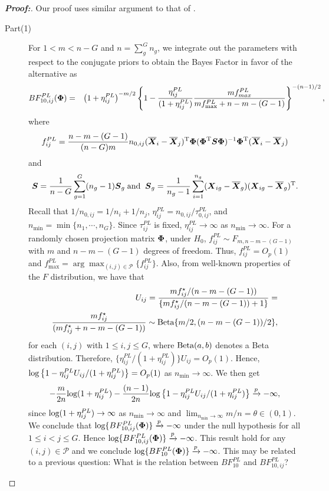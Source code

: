 \documentclass[times,sort&compress,3p]{elsarticle}
\theoremstyle{plain}%
\theoremstyle{definition}
\def\log{\hbox{log}}
\def\Beta{\hbox{Beta}}
\def\log{\hbox{log}}
\def\Beta{\hbox{Beta}}
\def\bse{\begin{eqnarray*}}
\def\ese{\end{eqnarray*}}
\def\be{\begin{eqnarray}}
\def\ee{\end{eqnarray}}
\def\trans{^{\rm T}}
\newcommand{\uS}       {\mbox{\boldmath$S$}}
\newcommand{\uX}       {\mbox{\boldmath$X$}}
\newcommand{\uPhi}              {\mbox{\boldmath$\Phi$}}
\begin{document}
\begin{proof}[\textbf{\upshape Proof:}]
Our proof uses similar argument to that of \citep{zoh2018powerful}.
\begin{description}
\item[Part(1)]
For $1 < m < n - G$ and $n = \sum^{G}_{g}n_g$, we integrate out the parameters with respect to the conjugate priors to obtain the Bayes Factor in favor of the alternative as
\be
BF^{PL}_{10, ij}(\uPhi) &=&\left(1 + \eta^{PL}_{ij} \right)^{-m/2} \left\{ 1 - \frac{\eta^{PL}_{ij}}{(1 + \eta^{PL}_{ij})}\frac{ m f_{max}^{PL}}{ m f_{\max}^{PL}  + n - m - (G-1)} \right\}^{-(n-1)/2} \nonumber,
\ee
where
\bse
f_{ij}^{PL}  = \frac{n - m - (G-1)}{(n-G)m} n_{0,ij}(\overline{\uX}_i - \overline{\uX}_j)\trans \uPhi(\uPhi\trans \uS\uPhi )^{-1}\uPhi\trans (\overline{\uX}_i - \overline{\uX}_j)
\ese
and $$ \uS = \frac{1}{n - G} \sum^{G}_{g=1}(n_g -1)\uS_{g}\; \text{and} \;\; \uS_g = \frac{1}{n_g - 1}\sum^{n_g}_{i=1}(\uX_{ig} - \overline{\uX}_{g})(\uX_{ig} - \overline{\uX}_{g})\trans.$$
Recall that $1/n_{0,ij} = 1/n_i + 1/n_j$, $\eta^{PL}_{ij} = n_{0,ij}/\tau^{PL}_{0,ij}$, and $n_{\min} = \min\{n_1, \cdots, n_G\}$.
Since $\tau^{PL}_{ij}$ is fixed, $\eta^{PL}_{ij} \rightarrow \infty$ as $n_{\min} \to \infty$.
For a randomly chosen projection matrix $\uPhi$, under $H_{0}$, $f^{PL}_{ij}  \sim F_{m, n-m-(G-1)}$ with $m$ and $n - m -(G-1)$ degrees of freedom.
Thus, $f^{PL}_{ij} = O_{p}(1)$ and $f^{PL}_{\max} = \arg\max_{(i,j) \in \mathcal{P}}\{ f_{ij}^{PL}\}$.
Also, from well-known properties of the $F$ distribution, we have that
\bse
U_{ij} = \frac{m f_{ij}^{\star}/(n-m-(G-1) )}{\{m f_{ij}^{\star}/(n-m- (G-1) ) + 1\}} = \nonumber \\
  \frac{m f_{ij}^{\star}}{( m f_{ij}^{\star} +n-m- (G-1))} \sim \Beta\{m/2, (n-m-(G-1))/2 \},
\ese
for each $(i,j)$ with $1 \leq i, j \leq G$, where $\Beta(a, b)$ denotes a Beta distribution.
Therefore, $\{\eta^{PL}_{ij}/(1 + \eta^{PL}_{ij})\} U_{ij} = O_{p}(1)$.
Hence, $\log\left\{ 1 -  \eta^{PL}_{ij} U_{ij}/(1 + \eta^{PL}_{ij}) \right\} = O_{p}(1)$ as $n_{\min} \to \infty$. We then get
\bse
-\frac{m}{2n}\log(1 + \eta^{PL}_{ij}) -\frac{(n-1)}{2n}\log\left\{ 1 -  \eta^{PL}_{ij} U_{ij}/(1 + \eta_{ij}^{PL}) \right\} \xrightarrow[]{p} -\infty,
\ese
since $\log(1 + \eta^{PL}_{ij}) \rightarrow \infty$ as $n_{\min} \rightarrow \infty$ and $\lim_{n_{\min} \rightarrow \infty} m/n = \theta \in (0, 1)$.
We conclude that $\log\{BF^{PL}_{10,ij}(\uPhi)\} \xrightarrow[]{p} -\infty$ under the null hypothesis for all $1 \leq i < j \leq G$.
Hence $\log\{BF^{PL}_{10,ij}(\uPhi)\} \xrightarrow[]{p} -\infty$. This result hold for any $(i,j) \in \mathcal{P}$ and we conclude $\log\{BF^{PL}_{10}(\uPhi)\} \xrightarrow[]{p} -\infty$. {\color{blue}This may be related to a previous question: What is the relation between $BF_{10}^{PL}$ and $BF_{10,ij}^{PL}$?}


\end{description}
\end{proof}
\end{document}
